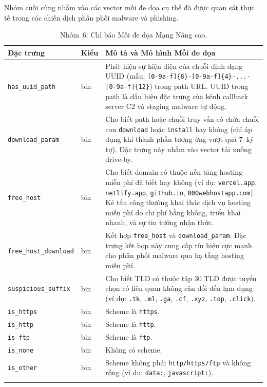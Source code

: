 \documentclass[a4paper,12pt]{article}
\begin{document}
Nhóm cuối cùng nhắm vào các vector mối đe dọa cụ thể đã được quan sát thực tế trong các chiến dịch phân phối malware và phishing.

\begin{longtable}{p{4.8cm}p{1.3cm}p{6.9cm}}
\toprule
\textbf{Đặc trưng} & \textbf{Kiểu} & \textbf{Mô tả và Mô hình Mối đe dọa} \\
\midrule
\endhead
\texttt{has\_uuid\_path} & bin &
    Phát hiện sự hiện diện của chuỗi định dạng UUID (mẫu: \texttt{[0-9a-f]\{8\}-[0-9a-f]\{4\}-...-[0-9a-f]\{12\}}) trong path URL. UUID trong path là dấu hiệu đặc trưng của kênh callback server C2 và staging malware tự động. \\
\texttt{download\_param} & bin &
    Cho biết path hoặc chuỗi truy vấn có chứa chuỗi con \texttt{download} hoặc \texttt{install} hay không (chỉ áp dụng khi thành phần tương ứng vượt quá 7~ký tự). Đặc trưng này nhắm vào vector tải xuống drive-by. \\
\texttt{free\_host} & bin &
    Cho biết domain có thuộc nền tảng hosting miễn phí đã biết hay không (ví dụ: \texttt{vercel.app}, \texttt{netlify.app}, \texttt{github.io}, \texttt{000webhostapp.com}). Kẻ tấn công thường khai thác dịch vụ hosting miễn phí do chi phí bằng không, triển khai nhanh, và sự tin tưởng nhận thức. \\
\texttt{free\_host\_download} & bin &
    Kết hợp \texttt{free\_host} và \texttt{download\_param}. Đặc trưng kết hợp này cung cấp tín hiệu cực mạnh cho phân phối malware qua hạ tầng hosting miễn phí. \\
\texttt{suspicious\_suffix} & bin &
    Cho biết TLD có thuộc tập 30 TLD được tuyển chọn có liên quan không cân đối đến lạm dụng (ví dụ: \texttt{.tk}, \texttt{.ml}, \texttt{.ga}, \texttt{.cf}, \texttt{.xyz}, \texttt{.top}, \texttt{.click}). \\
\texttt{is\_https} & bin & Scheme là \texttt{https}. \\
\texttt{is\_http}  & bin & Scheme là \texttt{http}. \\
\texttt{is\_ftp}   & bin & Scheme là \texttt{ftp}. \\
\texttt{is\_none}  & bin & Không có scheme. \\
\texttt{is\_other} & bin & Scheme không phải \texttt{http/https/ftp} và không rỗng (ví dụ: \texttt{data:}, \texttt{javascript:}). \\
\bottomrule
\caption{Nhóm~6: Chỉ báo Mối đe dọa Mạng Nâng cao.}
\label{tab:advanced}
\end{longtable}
\end{document}
